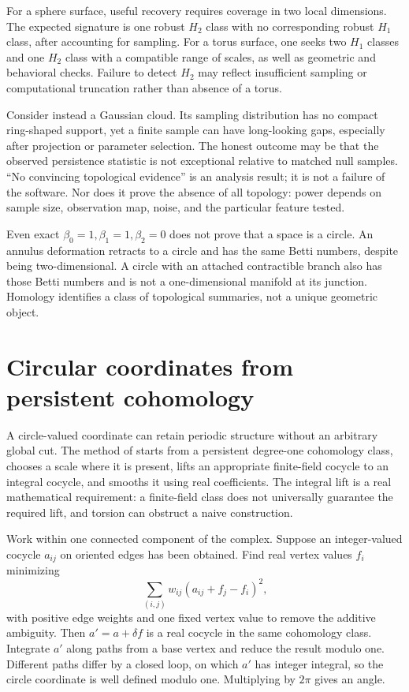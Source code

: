For a sphere surface, useful recovery requires coverage in two local dimensions. The expected signature is one robust $H_2$ class with no corresponding robust $H_1$ class, after accounting for sampling. For a torus surface, one seeks two $H_1$ classes and one $H_2$ class with a compatible range of scales, as well as geometric and behavioral checks. Failure to detect $H_2$ may reflect insufficient sampling or computational truncation rather than absence of a torus.

Consider instead a Gaussian cloud. Its sampling distribution has no compact ring-shaped support, yet a finite sample can have long-looking gaps, especially after projection or parameter selection. The honest outcome may be that the observed persistence statistic is not exceptional relative to matched null samples. ``No convincing topological evidence'' is an analysis result; it is not a failure of the software. Nor does it prove the absence of all topology: power depends on sample size, observation map, noise, and the particular feature tested.

Even exact $\beta_0=1,\beta_1=1,\beta_2=0$ does not prove that a space is a circle. An annulus deformation retracts to a circle and has the same Betti numbers, despite being two-dimensional. A circle with an attached contractible branch also has those Betti numbers and is not a one-dimensional manifold at its junction. Homology identifies a class of topological summaries, not a unique geometric object.

\section{Circular coordinates from persistent cohomology}
A circle-valued coordinate can retain periodic structure without an arbitrary global cut. The method of \citet{desilva2011} starts from a persistent degree-one cohomology class, chooses a scale where it is present, lifts an appropriate finite-field cocycle to an integral cocycle, and smooths it using real coefficients. The integral lift is a real mathematical requirement: a finite-field class does not universally guarantee the required lift, and torsion can obstruct a naive construction.

Work within one connected component of the complex. Suppose an integer-valued cocycle $a_{ij}$ on oriented edges has been obtained. Find real vertex values $f_i$ minimizing
\begin{equation}\label{eq:circular-smoothing}
\sum_{(i,j)}w_{ij}(a_{ij}+f_j-f_i)^2,
\end{equation}
with positive edge weights and one fixed vertex value to remove the additive ambiguity. Then $a'=a+\delta f$ is a real cocycle in the same cohomology class. Integrate $a'$ along paths from a base vertex and reduce the result modulo one. Different paths differ by a closed loop, on which $a'$ has integer integral, so the circle coordinate is well defined modulo one. Multiplying by $2\pi$ gives an angle.

